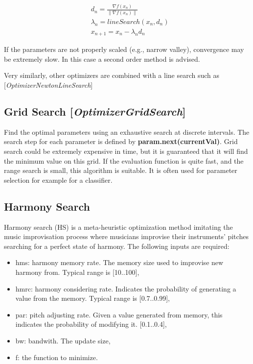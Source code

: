 \documentclass[11pt]{article}
\newcommand{\nllref}[1]{[\small{\textit{#1}}]}
\begin{document}
\begin{align}
& d_n = \frac{\nabla{f}(x_n)}{\lVert \nabla{f}(x_n) \lVert} \nonumber\\
& \lambda_n = lineSearch(x_n, d_n) \nonumber\\
& x_{n+1} = x_n - \lambda _n d_n
\end{align}

If the parameters are not properly scaled (e.g., narrow valley), convergence may be extremely slow. In this case a second order method is advised.

Very similarly, other optimizers are combined with a line search such as
\nllref{OptimizerNewtonLineSearch}

\subsection{Grid Search \nllref{OptimizerGridSearch}}
Find the optimal parameters using an exhaustive search at discrete intervals. The search step for each parameter is defined
by \textbf{param.next(currentVal)}. Grid search could be extremely expensive in time, but it is guaranteed that it will find the minimum
value on this grid. If the evaluation function is quite fast, and the range search is small, this algorithm is suitable. It is often used for parameter selection for example for a classifier.

\subsection{Harmony Search}
Harmony search (HS) is a meta-heuristic optimization method imitating the music improvisation process where
musicians improvise their instruments' pitches searching for a perfect state of harmony. The following inputs are required:
\begin{itemize}
\item hms: harmony memory rate. The memory size used to improvise new harmony from. Typical range is [10..100],
\item hmrc: harmony considering rate. Indicates the probability of generating a value from the memory. Typical range is [0.7..0.99],
\item par: pitch adjusting rate. Given a value generated from memory, this indicates the probability of modifying it. [0.1..0.4],
\item bw: bandwith. The update size,
\item f: the function to minimize.
\end{itemize}
\end{document}
